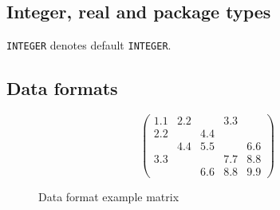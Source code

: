 

\subsection{Integer, real and package types}

{\tt INTEGER} denotes default {\tt INTEGER}.%


\subsection{Data formats} \label{nestd:dataformats}

\begin{figure}
   \caption{ \label{nestd:format eg}
      Data format example matrix
   }
   $$
      \left( \begin{array}{ccccc}
         1.1 & 2.2 &     & 3.3 &     \\
         2.2 &     & 4.4 &     &     \\
             & 4.4 & 5.5 &     & 6.6 \\
         3.3 &     &     & 7.7 & 8.8 \\
             &     & 6.6 & 8.8 & 9.9
      \end{array} \right)
   $$
\end{figure}

